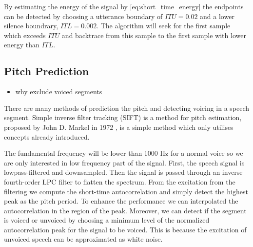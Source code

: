 By estimating the energy of the signal by \eqref{eq:short_time_energy} the endpoints can be detected by choosing a utterance boundary of \eg $ITU=0.02$ and a lower silence boundrary, \eg $ITL=0.002$. The algorithm will seek for the first sample which exceeds $ITU$ and backtrace from this sample to the first sample with lower energy than $ITL$.

\subsection{Pitch Prediction} %
\label{sub:detection_of_voicing}
\begin{itemize}
	\item why exclude voiced segments
\end{itemize}
There are many methods of prediction the pitch and detecting voicing in a speech segment. Simple inverse filter tracking (SIFT) is a method for pitch estimation, proposed by John D. Markel in 1972 \cite{markel72}, is a simple method which only utilises concepts already introduced. 

The fundamental frequency will be lower than 1000 Hz for a normal voice so we are only interested in low frequency part of the signal. First, the speech signal is lowpass-filtered and downsampled. Then the signal is passed through an inverse fourth-order LPC filter to flatten the spectrum. From the excitation from the filtering we compute the short-time autocorrelation and simply detect the highest peak as the pitch period. To enhance the performance we can interpolated the autocorrelation in the region of the peak. Moreover, we can detect if the segment is voiced or unvoiced by choosing a minimum level of the normalized autocorrelation peak for the signal to be voiced. This is because the excitation of unvoiced speech can be approximated as white noise.



